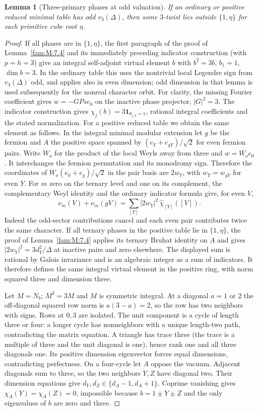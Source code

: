 \documentclass[11pt,a4paper]{article}
\numberwithin{equation}{section}
\newtheorem{lemma}[theorem]{Lemma}
\theoremstyle{remark}
\begin{document}
\begin{lemma}[Three-primary phases at odd valuation]\label{fam:Q:6.3}
If an ordinary or positive reduced minimal table has odd $v_3(\Delta)$, then some
$3$-twist lies outside $\{1,\eta\}$ for each primitive cube
root $\eta$.
\end{lemma}
\begin{proof}
If all phases are in $\{1,\eta\}$, the first paragraph of the
proof of Lemma~\ref{fam:M:7.4} and its immediately preceding
indicator construction (with $p=h=3$) give an integral
self-adjoint virtual element $b$ with $b^2=3b$, $b_1=1$,
$\dim b=3$. In the ordinary table this uses the nontrivial local
Legendre sign from $v_3(\Delta)$ odd, and applies also in even
dimension; odd dimension in that lemma is used subsequently for
the nonreal character orbit. For clarity, the missing Fourier
coefficient gives $w=-G Pse_0$ on the inactive phase projector,
$|G|^2=3$. The indicator construction gives
$\chi_j(b)=3\mathbf1_{\theta_{j,3}=1}$, rational integral
coefficients and the stated normalization.
For a positive reduced table we obtain the same element as follows. In the
integral minimal modular extension let $g$ be the fermion and
$A$ the positive space spanned by $(e_Y+e_{gY})/\sqrt2$ for even
fermion pairs. Write $W_o$ for the product of the local Weyls away
from three and $w=W_o e_0$. It interchanges the fermion
permutation and its monodromy sign. Therefore the coordinates of
$W_o(e_0+e_g)/\sqrt2$ in the pair basis are $2w_Y$, with
$w_Y=w_{gY}$ for even $Y$. For $m$ zero on the ternary level
and one on its complement, the complementary Weyl identity
and the ordinary indicator formula give, for even $V$,
\[
 \nu_m(V)+\nu_m(gV)=
        \sum_{[Y]}|2w_Y|^2\,\widehat\chi_{[Y]}([V]).
\]
Indeed the odd-sector contributions cancel and each even pair
contributes twice the same character. If all ternary phases in
the positive table lie in $\{1,\eta\}$, the proof of
Lemma~\ref{fam:M:7.4} applies its ternary Bruhat identity on
$A$ and gives $|2w_Y|^2=3d_Y^2/\Delta$ at inactive pairs
and zero elsewhere. The displayed sum is rational by Galois
invariance and is an algebraic integer as a sum of indicators.
It therefore defines the same integral virtual element in the
positive ring, with norm squared three and dimension three.


Let $M=N_b$; $M^2=3M$ and $M$ is symmetric integral. At a
diagonal $a=1$ or $2$ the off-diagonal squared row norm is
$a(3-a)=2$, so the row has two neighbors with signs.
Rows at $0,3$ are isolated. The unit component is a cycle of
length three or four: a longer cycle has nonneighbors with a
unique length-two path, contradicting the matrix equation. A
triangle has trace three (the trace is a multiple of three and
the unit diagonal is one), hence rank one and all three
diagonals one. Its positive dimension eigenvector forces equal
dimensions, contradicting perfectness. On a four-cycle let $A$
oppose the vacuum. Adjacent diagonals sum to three, so the two
neighbors $Y,Z$ have diagonal two. Their dimension equations
give $d_Y,d_Z\in\{d_A-1,d_A+1\}$. Coprime vanishing gives
$\chi_A(Y)=\chi_A(Z)=0$, impossible because $b=1\pm Y\pm Z$
and the only eigenvalues of $b$ are zero and three.
\end{proof}
\end{document}
